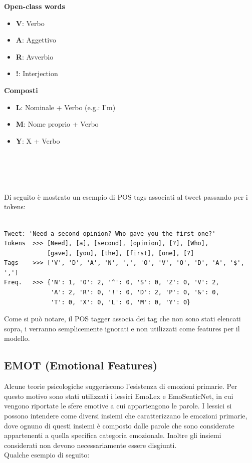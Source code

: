 \documentclass[oneside]{book}
\begin{document}
\begin{varwidth}[t]{\textwidth}
	\textbf{Open-class words}
	\begin{itemize}
		\item \textbf{V}: Verbo
		\item \textbf{A}: Aggettivo
		\item \textbf{R}: Avverbio
		\item \textbf{!}: Interjection
	\end{itemize}
\end{varwidth}
\hspace{11em}
\begin{varwidth}[t]{\textwidth}
	\textbf{Composti}
	\begin{itemize}
		\item \textbf{L}: Nominale + Verbo (e.g.: I'm)
		\item \textbf{M}: Nome proprio + Verbo
		\item \textbf{Y}: X + Verbo
	\end{itemize}
\end{varwidth}\\\\\\\\
Di seguito è mostrato un esempio di POS tags associati al tweet passando per i tokens:


\begin{lstlisting}[caption={Esempio di tweet con POS tag associte.}]

Tweet: 'Need a second opinion? Who gave you the first one?'
Tokens  >>> [Need], [a], [second], [opinion], [?], [Who],
            [gave], [you], [the], [first], [one], [?]
Tags    >>> ['V', 'D', 'A', 'N', ',', 'O', 'V', 'O', 'D', 'A', '$', ',']
Freq.   >>> {'N': 1, 'O': 2, '^': 0, 'S': 0, 'Z': 0, 'V': 2,
             'A': 2, 'R': 0, '!': 0, 'D': 2, 'P': 0, '&': 0,
             'T': 0, 'X': 0, 'L': 0, 'M': 0, 'Y': 0}
\end{lstlisting}
Come si può notare, il POS tagger associa dei tag che non sono stati elencati sopra, i verranno semplicemente ignorati e non utilizzati come features per il modello. 

\subsection{EMOT (Emotional Features)}
Alcune teorie psicologiche suggeriscono l'esistenza di emozioni primarie. Per questo motivo sono stati utilizzati i lessici EmoLex e EmoSenticNet, in cui vengono riportate le sfere emotive a cui appartengono le parole.
I lessici si possono intendere come diversi insiemi che caratterizzano le emozioni primarie, dove ognuno di questi insiemi è composto dalle parole che sono considerate appartenenti a quella specifica categoria emozionale. Inoltre gli insiemi considerati non devono necessariamente essere disgiunti.\\
Qualche esempio di seguito:
\end{document}
